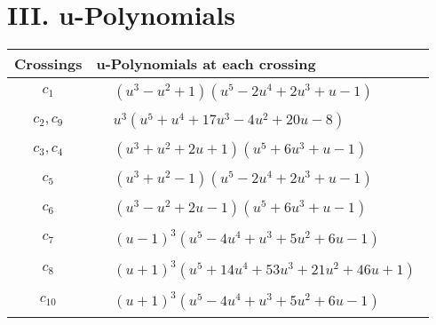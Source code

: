 \documentclass[1p]{elsarticle_modified}
\theoremstyle{definition}
\begin{document}
\newpage\renewcommand{\arraystretch}{1}
\centering \section*{ III. u-Polynomials}
\begin{tabular}{m{50pt}|m{274pt}}
Crossings & \hspace{64pt}u-Polynomials at each crossing \\
\hline $$\begin{aligned}c_{1}\end{aligned}$$&$\begin{aligned}
&(u^3- u^2+1)(u^5-2 u^4+2 u^3+u-1)
\end{aligned}$\\
\hline $$\begin{aligned}c_{2},c_{9}\end{aligned}$$&$\begin{aligned}
&u^3(u^5+u^4+17 u^3-4 u^2+20 u-8)
\end{aligned}$\\
\hline $$\begin{aligned}c_{3},c_{4}\end{aligned}$$&$\begin{aligned}
&(u^3+u^2+2 u+1)(u^5+6 u^3+u-1)
\end{aligned}$\\
\hline $$\begin{aligned}c_{5}\end{aligned}$$&$\begin{aligned}
&(u^3+u^2-1)(u^5-2 u^4+2 u^3+u-1)
\end{aligned}$\\
\hline $$\begin{aligned}c_{6}\end{aligned}$$&$\begin{aligned}
&(u^3- u^2+2 u-1)(u^5+6 u^3+u-1)
\end{aligned}$\\
\hline $$\begin{aligned}c_{7}\end{aligned}$$&$\begin{aligned}
&(u-1)^3(u^5-4 u^4+u^3+5 u^2+6 u-1)
\end{aligned}$\\
\hline $$\begin{aligned}c_{8}\end{aligned}$$&$\begin{aligned}
&(u+1)^3(u^5+14 u^4+53 u^3+21 u^2+46 u+1)
\end{aligned}$\\
\hline $$\begin{aligned}c_{10}\end{aligned}$$&$\begin{aligned}
&(u+1)^3(u^5-4 u^4+u^3+5 u^2+6 u-1)
\end{aligned}$\\
\hline
\end{tabular}\newpage\renewcommand{\arraystretch}{1}
\end{document}
